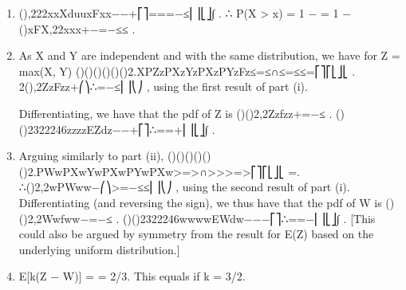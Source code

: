 \documentclass[a4paper,12pt]{article}
\begin{document}



\begin{enumerate}
    \item (),222xxXduuxFxx\theta\theta\theta\theta\theta\theta\theta\theta−−+⎡⎤===−≤⎢⎥⎣⎦∫ .
∴ P(X > x) = 1 − = 1 − ()xFX,22xxx\theta\theta\theta\theta\theta\theta+−=−≤≤ .
    \item As X and Y are independent and with the same distribution, we have for Z = max(X, Y)
()()()()()()2.XPZzPXzYzPXzPYzFz≤=≤∩≤=≤≤=⎡⎤⎡⎣⎦⎣ .
2(),2ZzFzz\theta\theta\theta\theta+⎛⎞∴=−≤⎜⎟⎝⎠ , using the first result of part (i).

Differentiating, we have that the pdf of Z is
()()2,2Zzfzz\theta\theta\theta\theta+=−≤ .
()()2322246zzzzEZdz\theta\theta\theta\theta\theta \theta\theta\theta\theta−−+⎡⎤∴==+⎢⎥⎣⎦∫ .
    \item  Arguing similarly to part (ii),
()()()()()()2.PWwPXwYwPXwPYwPXw>=>∩>>>=>⎡⎤⎡⎣⎦⎣ =.
∴()2,2wPWww\theta\theta\theta\theta−⎛⎞>=−≤≤⎜⎟⎝⎠ , using the second result of part (i).
Differentiating (and reversing the sign), we thus have that the pdf of W is
()()2,2Wwfww\theta\theta\theta\theta−=−≤ .
()()2322246wwwwEWdw\theta\theta\theta\theta\theta \theta\theta\theta\theta−−−⎡⎤∴==−⎢⎥⎣⎦∫
.
[This could also be argued by symmetry from the result for E(Z) based on the underlying uniform distribution.]
    \item  E[k(Z − W)] = \thetak[⅓ + ⅓] = 2\thetak/3. This equals \theta if k = 3/2.
\end{enumerate}
\end{document}

